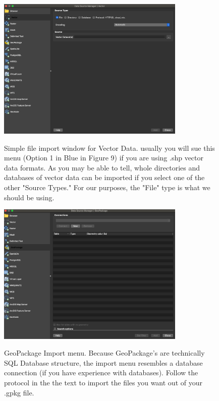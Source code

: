 \documentclass{article}
\begin{document}
\begin{figure}[htbp]
    \centering
    \includegraphics[width=0.8\textwidth]{Fig_10_Vector.png}
    \label{fig10}
    \caption{Simple file import window for Vector Data. usually you will sue this menu (Option 1 in Blue in Figure 9) if you are using .shp vector data formats. As you may be able to tell, whole directories and databases of vector data can be imported if you select one of the other "Source Types." For our purposes, the "File" type is what we should be using. }
\end{figure}

\begin{figure}[htbp]
    \centering
    \includegraphics[width=0.8\textwidth]{Fig_11_Geopackage.png}
    \label{fig11}
    \caption{GeoPackage Import menu. Because GeoPackage's are technically SQL Database structure, the import menu resembles a database connection (if you have experience with databases). Follow the protocol in the the text to import the files you want out of your .gpkg file.}
\end{figure}
\end{document}
